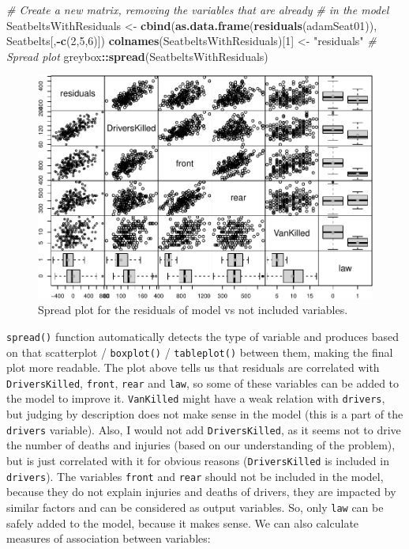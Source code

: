 \documentclass[]{book}
\newenvironment{Shaded}{\begin{snugshade}}{\end{snugshade}}
\newcommand{\CommentTok}[1]{\textcolor[rgb]{0.56,0.35,0.01}{\textit{#1}}}
\newcommand{\DecValTok}[1]{\textcolor[rgb]{0.00,0.00,0.81}{#1}}
\newcommand{\KeywordTok}[1]{\textcolor[rgb]{0.13,0.29,0.53}{\textbf{#1}}}
\newcommand{\NormalTok}[1]{#1}
\newcommand{\OperatorTok}[1]{\textcolor[rgb]{0.81,0.36,0.00}{\textbf{#1}}}
\newcommand{\StringTok}[1]{\textcolor[rgb]{0.31,0.60,0.02}{#1}}
\theoremstyle{definition}
\theoremstyle{definition}
\theoremstyle{definition}
\theoremstyle{definition}
\theoremstyle{remark}
\begin{document}
\begin{Shaded}
\begin{Highlighting}[]
\CommentTok{# Create a new matrix, removing the variables that are already}
\CommentTok{# in the model}
\NormalTok{SeatbeltsWithResiduals <-}
\StringTok{  }\KeywordTok{cbind}\NormalTok{(}\KeywordTok{as.data.frame}\NormalTok{(}\KeywordTok{residuals}\NormalTok{(adamSeat01)),}
\NormalTok{        Seatbelts[,}\OperatorTok{-}\KeywordTok{c}\NormalTok{(}\DecValTok{2}\NormalTok{,}\DecValTok{5}\NormalTok{,}\DecValTok{6}\NormalTok{)])}
\KeywordTok{colnames}\NormalTok{(SeatbeltsWithResiduals)[}\DecValTok{1}\NormalTok{] <-}\StringTok{ "residuals"}
\CommentTok{# Spread plot}
\NormalTok{greybox}\OperatorTok{::}\KeywordTok{spread}\NormalTok{(SeatbeltsWithResiduals)}
\end{Highlighting}
\end{Shaded}

\begin{figure}
\centering
\includegraphics{Svetunkov--2022----ADAM_files/figure-latex/carSeatsSpread-1.pdf}
\caption{\label{fig:carSeatsSpread}Spread plot for the residuals of model vs not included variables.}
\end{figure}

\texttt{spread()} function automatically detects the type of variable and produces based on that scatterplot / \texttt{boxplot()} / \texttt{tableplot()} between them, making the final plot more readable. The plot above tells us that residuals are correlated with \texttt{DriversKilled}, \texttt{front}, \texttt{rear} and \texttt{law}, so some of these variables can be added to the model to improve it. \texttt{VanKilled} might have a weak relation with \texttt{drivers}, but judging by description does not make sense in the model (this is a part of the \texttt{drivers} variable). Also, I would not add \texttt{DriversKilled}, as it seems not to drive the number of deaths and injuries (based on our understanding of the problem), but is just correlated with it for obvious reasons (\texttt{DriversKilled} is included in \texttt{drivers}). The variables \texttt{front} and \texttt{rear} should not be included in the model, because they do not explain injuries and deaths of drivers, they are impacted by similar factors and can be considered as output variables. So, only \texttt{law} can be safely added to the model, because it makes sense. We can also calculate measures of association between variables:
\end{document}
